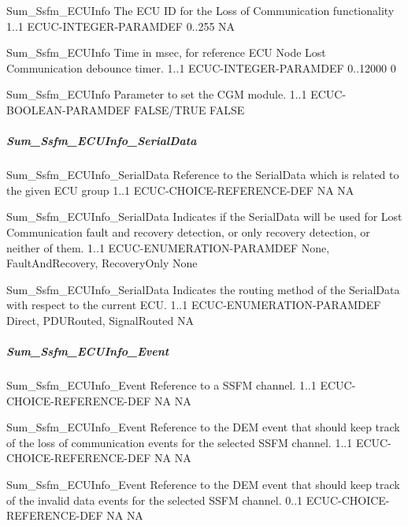 
{Sum_Ssfm_ECUInfo}
{The ECU ID for the Loss of Communication functionality}
{1..1}
{ECUC-INTEGER-PARAMDEF}
{0..255}
{NA}

{Sum_Ssfm_ECUInfo}
{Time in msec, for reference ECU Node Lost Communication debounce timer.}
{1..1}
{ECUC-INTEGER-PARAMDEF}
{0..12000}
{0}


{Sum_Ssfm_ECUInfo}
{Parameter to set the CGM module.}
{1..1}
{ECUC-BOOLEAN-PARAMDEF}
{FALSE/TRUE}
{FALSE}


\subparagraph{Sum_Ssfm_ECUInfo_SerialData}

{Sum_Ssfm_ECUInfo_SerialData}
{Reference to the SerialData which is related to the given ECU group}
{1..1}
{ECUC-CHOICE-REFERENCE-DEF}
{NA}
{NA}


{Sum_Ssfm_ECUInfo_SerialData}
{Indicates if the SerialData will be used for Lost Communication fault and recovery detection, or only recovery detection, or neither of them.}
{1..1}
{ECUC-ENUMERATION-PARAMDEF}
{None, FaultAndRecovery, RecoveryOnly}
{None}


{Sum_Ssfm_ECUInfo_SerialData}
{Indicates the routing method of the SerialData with respect to the current ECU.}
{1..1}
{ECUC-ENUMERATION-PARAMDEF}
{Direct, PDURouted, SignalRouted}
{NA}


\subparagraph{Sum_Ssfm_ECUInfo_Event}


{Sum_Ssfm_ECUInfo_Event}
{Reference to a SSFM channel.}
{1..1}
{ECUC-CHOICE-REFERENCE-DEF}
{NA}
{NA}


{Sum_Ssfm_ECUInfo_Event}
{Reference to the DEM event that should keep track of the loss of communication events for the selected SSFM channel.}
{1..1}
{ECUC-CHOICE-REFERENCE-DEF}
{NA}
{NA}

{Sum_Ssfm_ECUInfo_Event}
{Reference to the DEM event that should keep track of the invalid data events for the selected SSFM channel.}
{0..1}
{ECUC-CHOICE-REFERENCE-DEF}
{NA}
{NA}


{  } 

